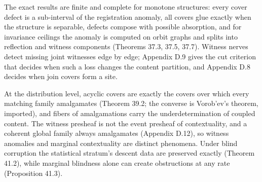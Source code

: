 
The exact results are finite and complete for monotone structures: every cover defect is a sub-interval of the registration anomaly, all covers glue exactly when the structure is separable, defects compose with possible absorption, and for invariance ceilings the anomaly is computed on orbit graphs and splits into reflection and witness components (Theorems 37.3, 37.5, 37.7). Witness nerves detect missing joint witnesses edge by edge; Appendix D.9 gives the cut criterion that decides when such a loss changes the content partition, and Appendix D.8 decides when join covers form a site.

At the distribution level, acyclic covers are exactly the covers over which every matching family amalgamates (Theorem 39.2; the converse is Vorob'ev's theorem, imported), and fibers of amalgamations carry the underdetermination of coupled content. The witness presheaf is not the event presheaf of contextuality, and a coherent global family always amalgamates (Appendix D.12), so witness anomalies and marginal contextuality are distinct phenomena. Under blind corruption the statistical stratum's descent data are preserved exactly (Theorem 41.2), while marginal blindness alone can create obstructions at any rate (Proposition 41.3).
